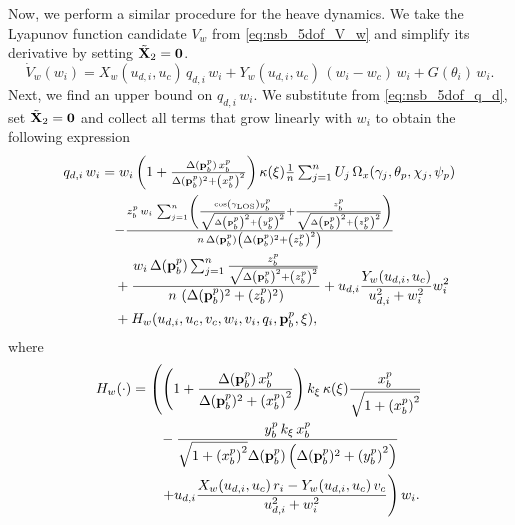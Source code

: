 Now, we perform a similar procedure for the heave dynamics.
We take the Lyapunov function candidate $V_w$ from \eqref{eq:nsb_5dof_V_w} and simplify its derivative by setting $\tilde{\mathbf{X}}_2 = \mathbf{0}$.
\begin{equation}
    \dot{V}_w(w_i) = X_w\left(u_{d,i}, u_c\right)\,q_{d,i}\,w_i + Y_w\left(u_{d,i}, u_c\right)\,\left(w_i - w_c\right)\,w_i + G(\theta_i)\,w_i. \label{eq:nsb_5dof_V_w_dot_2}
\end{equation}
Next, we find an upper bound on $q_{d,i}\,w_i$.
We substitute from \eqref{eq:nsb_5dof_q_d}, set $\tilde{\mathbf{X}}_2 = \mathbf{0}$ and collect all terms that grow linearly with $w_i$ to obtain the following expression
\begin{equation}
    \begin{split}
        {q_{d,i}\,w_i} &= \scale[1]{ w_i\left(1 + \frac{\Delta(\mat{p}_b^p)\,x_b^p}{\Delta(\mat{p}_b^p)^2 + \left(x_b^p\right)^2}\right) \kappa(\xi) \frac{1}{n} \sum_{j=1}^n U_j\,\Omega_x(\gamma_j, \theta_p, \chi_j, \psi_p)} \\
        &\quad \scale[1]{- \frac{z_b^p\,w_i\,\sum_{j=1}^n\left(\frac{\cos\left(\gamma_{\rm LOS}\right)y_b^p}{\sqrt{\Delta\left(\mat{p}_b^p\right)^2 + \left(y_b^p\right)^2}} + \frac{z_b^p}{\sqrt{\Delta\left(\mat{p}_b^p\right)^2 + \left(z_b^p\right)^2}}\right)}{n\,\Delta(\mat{p}_b^p)\left(\Delta(\mat{p}_b^p)^2 + \left(z_b^p\right)^2\right)} } \\
        &\quad  + \frac{w_i\,\Delta(\mat{p}_b^p)\sum_{j=1}^n\frac{z_b^p}{\sqrt{\Delta\left(\mat{p}_b^p\right)^2 + \left(z_b^p\right)^2}}}{n\,\left(\Delta(\mat{p}_b^p)^2 + (z_b^p)^2\right)} + u_{d,i}\frac{Y_w(u_{d,i}, u_c)}{{u_{d,i}^2 + w_i^2}}w_i^2 \\
        &\quad + H_w(u_{d,i}, u_c, v_c, w_i, v_i, q_i, \mat{p}_b^p, \xi),
    \end{split}
\end{equation}
where
\begin{equation}
    \begin{split}
        H_w(\cdot) & = \left(\left(1 + \frac{\Delta(\mathbf{p}_b^p)\,x_b^p}{\Delta(\mathbf{p}_b^p)^2 + \left(x_b^p\right)^2}\right)k_{\xi}\,\kappa(\xi)\frac{x_b^p}{\sqrt{1+\left(x_b^p\right)^2}} \right. \\
        & \qquad - \frac{y_b^p\,k_{\xi}\,x_b^p}{\sqrt{1+\left(x_b^p\right)^2}\Delta(\mathbf{p}_b^p)\left(\Delta(\mathbf{p}_b^p)^2 + \left(y_b^p\right)^2\right)} \\
        &\qquad \left. + u_{d,i}\frac{X_w(u_{d,i}, u_c)\,r_i - Y_w(u_{d,i}, u_c)\,v_c}{{u_{d,i}^2 + w_i^2}} \right) w_i.
    \end{split}
\end{equation}
